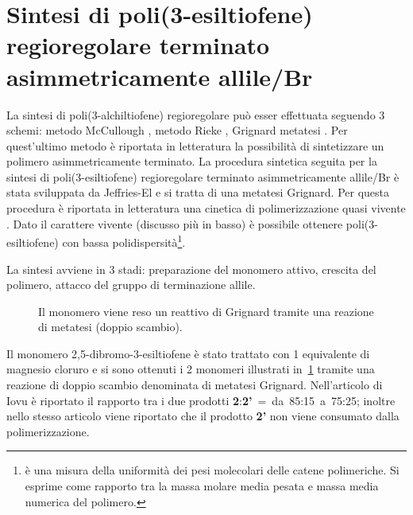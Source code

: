 \section[Sintesi di poli(3-esiltiofene) regioregolare terminato allile/Br]{Sintesi di poli(3-esiltiofene) regioregolare terminato asimmetricamente allile/Br}

La sintesi di poli(3-alchiltiofene) regioregolare può esser effettuata seguendo 3 schemi: metodo McCullough \cite{pol-McCullough}, metodo Rieke \cite{pol-rieke}, Grignard metatesi \cite{pol-grim}. Per quest'ultimo metodo è riportata in letteratura \cite{pol-p3ht-end} la possibilità di sintetizzare un polimero asimmetricamente terminato.
La procedura sintetica seguita per la sintesi di poli(3-esiltiofene) regioregolare terminato asimmetricamente allile/Br è stata sviluppata da Jeffries-El \etal \cite{pol-p3ht-end} e si tratta di una metatesi Grignard. Per questa procedura è riportata in letteratura una cinetica di polimerizzazione quasi vivente \cite{pol-grim-living}. Dato il carattere vivente (discusso più in basso) è possibile ottenere poli(3-esiltiofene) con bassa polidispersità\footnote{{} è una misura della uniformità dei pesi molecolari delle catene polimeriche. Si esprime come rapporto tra la massa molare media pesata e massa media numerica del polimero.}. 

La sintesi avviene in 3 stadi: preparazione del monomero attivo, crescita del polimero, attacco del gruppo di terminazione allile.


\begin{figure}
\caption{\footnotesize{Il monomero viene reso un reattivo di Grignard tramite una reazione di metatesi (doppio scambio).}
\label{fig:monomero-grignard}}
\end{figure}
Il monomero 2,5-dibromo-3-esiltiofene è stato trattato con 1 equivalente di \tBu magnesio cloruro e si sono ottenuti i 2 monomeri illustrati in~\ref{fig:monomero-grignard} tramite una reazione di doppio scambio denominata di metatesi Grignard. Nell'articolo di Iovu \etal \cite{pol-grim-living} è riportato il rapporto tra i due prodotti {\bf 2}:{\bf 2'}~=~da~85:15~a~75:25; inoltre nello stesso articolo viene riportato che il prodotto {\bf 2'} non viene consumato dalla polimerizzazione.

